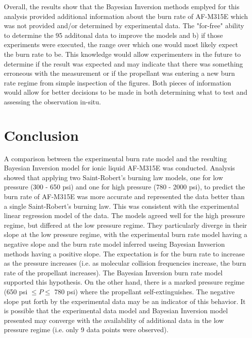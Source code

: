 \documentclass{article}
\begin{document}
Overall, the results show that the Bayesian Inversion methods emplyed for this analysis provided additional information
about the burn rate of AF-M315E which was not provided and/or determined by experimental data. The "for-free" ability to
determine the 95%
additonal data to improve the models and b) if those experiments were executed, the range over which one would most likely
expect the burn rate to be. This knowledge would allow experimenters in the future to determine if the result was expected
and may indicate that there was something erroneous with the measurement or if the propellant was entering a new burn rate
regime from simple inspection of the figures. Both pieces of information would allow for better decisions to be made in
both determining what to test and assessing the observation in-situ.

\section{Conclusion} \label{conclusion}

A comparison between the experimental burn rate model and the resulting Bayesian Inversion model for ionic liquid
AF-M315E was conducted. Analysis showed that applying two Saint-Robert's burning law models, one for low pressure
(300 - 650 psi) and one for high pressure (780 - 2000 psi), to predict the burn rate of AF-M315E was more accurate
and represented the data better than a single Saint-Robert's burning law. This was consistent with the experimental
linear regression model of the data. The models agreed well for the high pressure regime, but differed at the low
pressure regime. They particularly diverge in their slope at the low pressure regime, with the experimental burn
rate model having a negative slope and the burn rate model inferred useing Bayesian Invserion methods having a positive
slope. The expectation is for the burn rate to increase as the pressure increases (i.e. as molecular collision frequencies
increase, the burn rate of the propellant increases). The Bayesian Inversion burn rate model supported this hypothesis.
On the other hand, there is a marked pressure regime (650 psi $\leq P \leq$ 780 psi) where the propellant self-extinguishes.
The negative slope put forth by the experimental data may be an indicator of this behavior. It is possible that the
experimental data model and Bayesian Inversion model presented may converge with the availability of additional data
in the low pressure regime (i.e. only 9 data points were observed).

\nocite{*}


\end{document}
